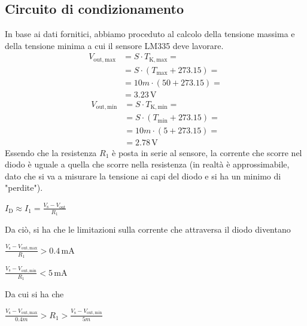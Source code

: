 \documentclass[a4paper]{article}
\begin{document}
		\subsection{Circuito di condizionamento}
			In base ai dati fornitici, abbiamo proceduto al calcolo della tensione massima e della tensione minima a cui il sensore LM335 deve lavorare.
			\begin{equation*}
				\begin{split}
					V_{\mathrm{out, max}} &= S \cdot T_{\mathrm{K, max}} = \\
										  &= S \cdot (T_{\mathrm{max}} + 273.15) = \\
										  &= 10m \cdot (50 + 273.15) = \\
										  &= 3.23 \, \mathrm{V}
				\end{split}
			\end{equation*}
			\begin{equation*}
				\begin{split}
					V_{\mathrm{out, min}} &= S \cdot T_{\mathrm{K, min}} = \\
										  &= S \cdot (T_{\mathrm{min}} + 273.15) = \\
										  &= 10m \cdot (5 + 273.15) = \\
										  &= 2.78 \, \mathrm{V}
				\end{split}
			\end{equation*}
			Essendo che la resistenza $ R_{1} $ è posta in serie al sensore, la corrente che scorre nel diodo è uguale a quella che scorre nella resistenza (in realtà è approssimabile, dato che si va a misurare la tensione ai capi del diodo e si ha un minimo di "perdite").
			\begin{center}
				$ I_{\mathrm{D}} \approx I_{1} = \frac{V_{\mathrm{s}} - V_{\mathrm{out}}}{R_{1}} $
			\end{center}
			Da ciò, si ha che le limitazioni sulla corrente che attraversa il diodo diventano
			\begin{center}
				$ \frac{V_{\mathrm{s}} - V_{\mathrm{out, max}}}{R_{1}} > 0.4 \, \mathrm{mA} $
			\end{center}
			\begin{center}
				$ \frac{V_{\mathrm{s}} - V_{\mathrm{out, min}}}{R_{1}} < 5 \, \mathrm{mA} $
			\end{center}
			Da cui si ha che
			\begin{center}
				$ \frac{V_{\mathrm{s}} - V_{\mathrm{out, max}}}{0.4m} > R_{1} > \frac{V_{\mathrm{s}} - V_{\mathrm{out, min}}}{5m} $
			\end{center}
\end{document}
